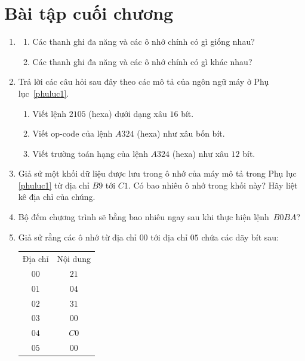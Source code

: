 \section{Bài tập cuối chương}


\begin{multicols}{2}

  \begin{enumerate}
  \item
    \begin{enumerate}
    \item Các thanh ghi đa năng và các ô nhớ chính có gì giống nhau?

    \item Các thanh ghi đa năng và các ô nhớ chính có gì khác nhau?
 
    \end{enumerate}

  \item Trả lời các câu hỏi sau đây theo các mô tả của ngôn ngữ máy ở Phụ
    lục~\ref{phuluc1}.
    \begin{enumerate}
    \item Viết lệnh $2105$ (hexa) dưới dạng xâu $16$ bít.

    \item Viết op-code của lệnh $A324$ (hexa) như xâu bốn bít.

    \item Viết trường toán hạng của lệnh $A324$ (hexa) như xâu $12$ bít.
    \end{enumerate}

  \item Giả sử một khối dữ liệu được lưu trong ô nhớ của máy mô tả trong Phụ lục
    \ref{phuluc1} từ địa chỉ $B9$ tới $C1$. Có bao nhiêu ô nhớ trong khối này? Hãy liệt kê
    địa chỉ của chúng.

  \item Bộ đếm chương trình sẽ bằng bao nhiêu ngay sau khi thực hiện lệnh~$B0BA$?

  \item Giả sử rằng các ô nhớ từ địa chỉ $00$ tới địa chỉ $05$ chứa các dãy bít sau:

    \begin{tabular}{cc}
      Địa chỉ & Nội dung \\
      $00$    & $21$     \\
      $01$    & $04$     \\
      $02$    & $31$     \\
      $03$    & $00$     \\
      $04$    & $C0$     \\
      $05$     & $00$ 
    \end{tabular}


\end{enumerate}
\end{multicols}
